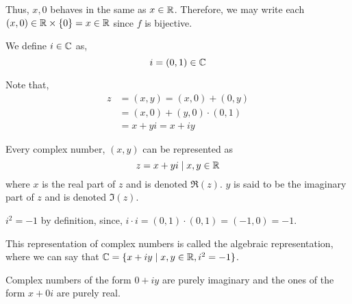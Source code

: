 Thus, \(x, 0\) behaves in the same as \(x \in \mathbb R\). Therefore, we may write each \((x, 0) \in 
\mathbb R \times \{0\} = x \in \mathbb R\) since \(f\) is bijective.

\begin{definition}
    We define \(i \in \mathbb C\) as, 
    \[i = (0, 1) \in \mathbb C\]
\end{definition}

Note that, 
\begin{align*}
    z &= (x, y) = (x, 0) + (0, y)  \\ 
    &= (x, 0) + (y, 0) \cdot (0,1) \\
    &= x + yi = x + iy
\end{align*}

\begin{lemma}
    Every complex number, \((x, y)\) can be represented as 
    \[
        z = x + yi \mid x, y \in \mathbb R\]
    where \(x\) is the real part of \(z\) and is denoted \(\Re(z)\). \(y\) is said
    to be the imaginary part of \(z\) and is denoted \(\Im(z)\).
\end{lemma}

\(i^2 = -1\) by definition, since, \(i \cdot i = (0,1) \cdot (0,1) = (-1,0) = -1\).

This representation of complex numbers is called the algebraic representation, where we can
say that \(\mathbb C = \{x + iy \mid x, y \in \mathbb R, i^2 = -1\}\). 

Complex numbers of the form \(0 + iy\) are purely imaginary and the ones of the form \(x + 0i\)
are purely real. 